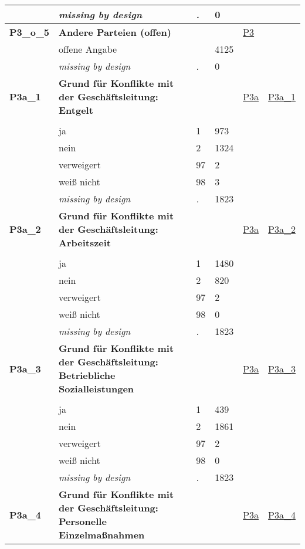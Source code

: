 \begin{longtable}{| L{2.45cm} | L{6cm} | C{1.5cm} | R{1cm} | C{2.25cm} | C{2.25cm} |}
   & \textit{missing by design} & \textit{.} & 0 &  &  \\ 
   \midrule
\textbf{P3\_o\_5}\label{var:P3:o:5} & \textbf{Andere Parteien (offen)} &  &  & \hyperref[P3]{P3} & \hyperref[var:suf:]{} \\ 
   & offene Angabe &  & 4125 &  &  \\ 
   & \textit{missing by design} & \textit{.} & 0 &  &  \\ 
   \midrule
\textbf{P3a\_1}\label{var:P3a:1} & \textbf{Grund für Konflikte mit der Geschäftsleitung: Entgelt} &  &  & \hyperref[P3a]{P3a} & \hyperref[var:suf:P3a:1]{P3a\_1} \\ 
   &  &  &  &  &  \\ 
   & ja & 1 & 973 &  &  \\ 
   & nein & 2 & 1324 &  &  \\ 
   & verweigert & 97 & 2 &  &  \\ 
   & weiß nicht & 98 & 3 &  &  \\ 
   & \textit{missing by design} & \textit{.} & 1823 &  &  \\ 
   \midrule
\textbf{P3a\_2}\label{var:P3a:2} & \textbf{Grund für Konflikte mit der Geschäftsleitung: Arbeitszeit} &  &  & \hyperref[P3a]{P3a} & \hyperref[var:suf:P3a:2]{P3a\_2} \\ 
   &  &  &  &  &  \\ 
   & ja & 1 & 1480 &  &  \\ 
   & nein & 2 & 820 &  &  \\ 
   & verweigert & 97 & 2 &  &  \\ 
   & weiß nicht & 98 & 0 &  &  \\ 
   & \textit{missing by design} & \textit{.} & 1823 &  &  \\ 
   \midrule
\textbf{P3a\_3}\label{var:P3a:3} & \textbf{Grund für Konflikte mit der Geschäftsleitung: Betriebliche Sozialleistungen} &  &  & \hyperref[P3a]{P3a} & \hyperref[var:suf:P3a:3]{P3a\_3} \\ 
   &  &  &  &  &  \\ 
   & ja & 1 & 439 &  &  \\ 
   & nein & 2 & 1861 &  &  \\ 
   & verweigert & 97 & 2 &  &  \\ 
   & weiß nicht & 98 & 0 &  &  \\ 
   & \textit{missing by design} & \textit{.} & 1823 &  &  \\ 
   \midrule
\textbf{P3a\_4}\label{var:P3a:4} & \textbf{Grund für Konflikte mit der Geschäftsleitung: Personelle Einzelmaßnahmen} &  &  & \hyperref[P3a]{P3a} & \hyperref[var:suf:P3a:4]{P3a\_4} \\ 

\end{longtable}
